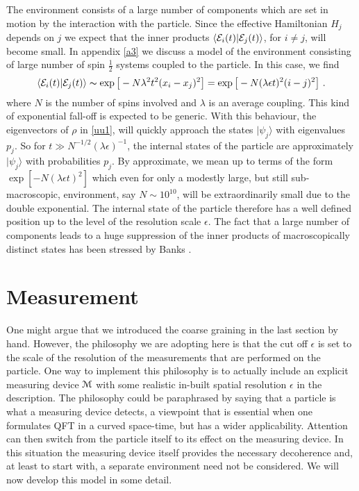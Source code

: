 \documentclass[12pt]{article}
\def\BM{{\EuScript M}}
\def\ket#1{| #1\rangle}
\def\braket#1#2{\VEV{#1 | #2}}
\def\VEV#1{\langle #1\rangle}
\newcommand{\EQ}[1]{\begin{equation}\begin{split} #1
\end{split}\end{equation}}
\begin{document}
The environment consists of a large number of components which are set in motion by the interaction with the particle. Since the effective Hamiltonian $H_j$ depends on $j$ we expect that the inner products $\braket{{\cal E}_i(t)}{{\cal E}_j(t)}$, for $i\neq j$, will become small. In appendix \ref{a3} we discuss a model of the environment consisting of large number of spin $\frac12$ systems coupled to the particle. In this case, we find
\EQ{
\braket{{\cal E}_i(t)}{{\cal E}_j(t)}\thicksim \exp\big[-N\lambda^2 t^2(x_i-x_j)^2\big]=\exp\big[-N(\lambda\epsilon t)^2(i-j)^2\big]\ .
}
where $N$ is the number of spins involved and $\lambda$ is an average coupling. This kind of exponential fall-off is expected to be generic. With this behaviour, the eigenvectors of $\rho$ in \eqref{uu1}, will quickly approach the states $\ket{\psi_j}$ with eigenvalues $p_j$. So for $t\gg N^{-1/2}(\lambda\epsilon)^{-1}$, the internal states of the particle 
are approximately $\ket{\psi_j}$ with probabilities $p_j$. By approximate, we mean up to terms of the form $\exp[-N(\lambda\epsilon t)^2]$ which even for only a modestly large, but still sub-macroscopic, environment, say $N\sim 10^{10}$, will be extraordinarily small due to the double exponential. The internal state of the particle therefore has a well defined position up to the level of the resolution scale $\epsilon$. The fact that a large number of components leads to 
a huge suppression of the inner products of macroscopically distinct states has been stressed by Banks \cite{Banks:2009gw}.  

\section{Measurement}\label{s3}


One might argue that we introduced the coarse graining in the last section by hand. However, the philosophy we are adopting here is that the cut off $\epsilon$ is set to the scale of the resolution of the measurements that are performed on the particle. One way to implement this philosophy is to 
actually include an explicit measuring device $\BM$ with some realistic in-built spatial resolution $\epsilon$ in the description. The philosophy could be paraphrased by saying that a particle is what a measuring device detects, a viewpoint that is essential when one formulates QFT in a curved space-time, but has a wider applicability. 
Attention can then switch from the particle itself to its effect on the measuring device. In this situation the measuring device itself provides the necessary decoherence and, at least to start with, a separate environment need not be considered. We will now develop this model in some detail.
\end{document}
